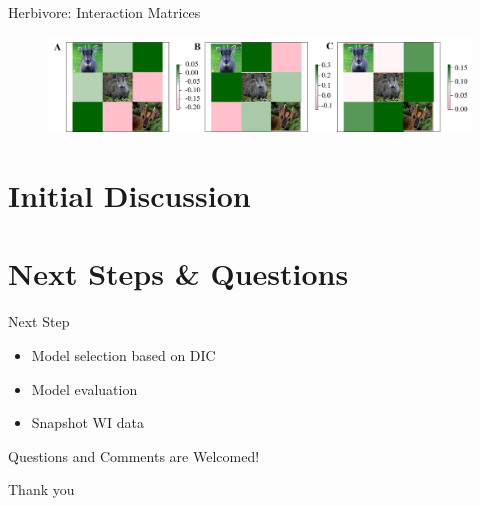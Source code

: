 \documentclass{beamer}
\begin{document}
\begin{frame}{Herbivore: Interaction Matrices}
	\begin{figure}[ht]
		\centering
		\includegraphics[scale=.23]{fig/TJH/herb/TJH_herb.jpg}
		\label{herb}
	\end{figure}
\end{frame}


\section{Initial Discussion}

\section{Next Steps \& Questions}

\begin{frame}{Next Step}
\begin{itemize}
	\item Model selection based on DIC
	\item Model evaluation
	\item Snapshot WI data
\end{itemize}
\end{frame}


\begin{frame}
	\huge{Questions and Comments are Welcomed!}
\end{frame}

\begin{frame}
	\Huge{Thank you}
\end{frame}
\end{document}
